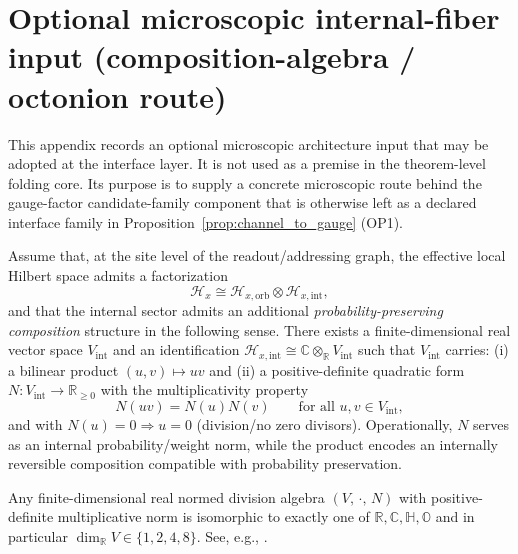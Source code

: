\section{Optional microscopic internal-fiber input (composition-algebra / octonion route)}
\label{app:internal_fiber_g2_optional}

\AuditTag This appendix records an optional microscopic architecture input that may be adopted at the interface layer.
It is not used as a premise in the theorem-level folding core.
Its purpose is to supply a concrete microscopic route behind the gauge-factor candidate-family component that is otherwise left as a declared interface family in Proposition~\ref{prop:channel_to_gauge} (OP1).

\begin{assumption}
\label{ass:m2star_internal_fiber_g2}
Assume that, at the site level of the readout/addressing graph, the effective local Hilbert space admits a factorization
\[
\mathcal{H}_x \cong \mathcal{H}_{x,\mathrm{orb}}\otimes \mathcal{H}_{x,\mathrm{int}},
\]
and that the internal sector admits an additional \emph{probability-preserving composition} structure in the following sense.
There exists a finite-dimensional real vector space $V_{\mathrm{int}}$ and an identification
$
\mathcal{H}_{x,\mathrm{int}} \cong \mathbb{C}\otimes_{\mathbb{R}} V_{\mathrm{int}}
$
such that $V_{\mathrm{int}}$ carries:
(i) a bilinear product $(u,v)\mapsto uv$ and
(ii) a positive-definite quadratic form $N:V_{\mathrm{int}}\to \mathbb{R}_{\ge 0}$
with the multiplicativity property
\[
N(uv)=N(u)N(v)\qquad \text{for all }u,v\in V_{\mathrm{int}},
\]
and with $N(u)=0 \Rightarrow u=0$ (division/no zero divisors).
Operationally, $N$ serves as an internal probability/weight norm, while the product encodes an internally reversible composition compatible with probability preservation.
\end{assumption}

\begin{proposition}
\label{prop:hurwitz_normed_division_algebras}
Any finite-dimensional real normed division algebra $(V,\,\cdot,\,N)$ with positive-definite multiplicative norm is isomorphic to exactly one of
$
\mathbb{R},\mathbb{C},\mathbb{H},\mathbb{O}
$
and in particular $\dim_{\mathbb{R}} V\in\{1,2,4,8\}$.
See, e.g., \cite{Baez2002,SpringerVeldkamp2000}.
\end{proposition}

